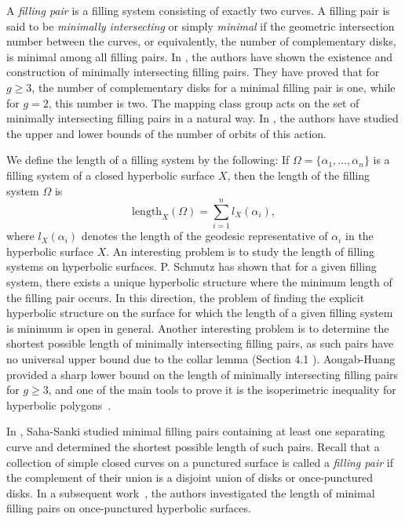 \documentclass[11pt,reqno]{amsart}
\theoremstyle{plain}
\theoremstyle{definition}
\theoremstyle{remark}
\numberwithin{equation}{section}
\numberwithin{figure}{section}
\begin{document}
A \emph{filling pair} is a filling system consisting of exactly two curves. A filling pair is said to be \emph{minimally intersecting} or simply \emph{minimal} if the geometric intersection number between the curves, or equivalently, the number of complementary disks, is minimal among all filling pairs. In \cite{AougabMinimally, Sanki2018}, the authors have shown the existence and construction of minimally intersecting filling pairs. They have proved that for $g \geq 3$, the number of complementary disks for a minimal filling pair is one, while for $g = 2$, this number is two. The mapping class group acts on the set of minimally intersecting filling pairs in a natural way.  In \cite{AougabMinimally}, the authors have studied the upper and lower bounds of the number of orbits of this action.

We define the length of a filling system by the following: If $\Omega=\{ \alpha_1, \dots, \alpha_n\}$ is a filling system of a closed hyperbolic surface $X$, then the length of the filling system $\Omega$ is $$\mathrm{length}_X(\Omega)=\sum\limits_{i=1}^nl_X(\alpha_i),$$ where $l_X(\alpha_i)$ denotes the length of the geodesic representative of $\alpha_i$ in the hyperbolic surface $X$. An interesting problem is to study the length of filling systems on hyperbolic surfaces. P. Schmutz \cite{Schaller1999} has shown that for a given filling system, there exists a unique hyperbolic structure where the minimum length of the filling pair occurs. In this direction, the problem of finding the explicit hyperbolic structure on the surface for which the length of a given filling system is minimum is open in general. Another interesting problem is to determine the shortest possible length of minimally intersecting filling pairs, as such pairs have no universal upper bound due to the collar lemma (Section 4.1 \cite{Buser}). Aougab-Huang provided a sharp lower bound on the length of minimally intersecting filling pairs for $g \geq 3$, and one of the main tools to prove it is the isoperimetric inequality for hyperbolic polygons~\cite{Bezdek}.

In \cite{SahaSep}, Saha-Sanki studied minimal filling pairs containing at least one separating curve and determined the shortest possible length of such pairs. Recall that a collection of simple closed curves on a punctured surface is called a \emph{filling pair} if the complement of their union is a disjoint union of disks or once-punctured disks. In a subsequent work~\cite{SahaSanki2024}, the authors investigated the length of minimal filling pairs on once-punctured hyperbolic surfaces. 
\end{document}
